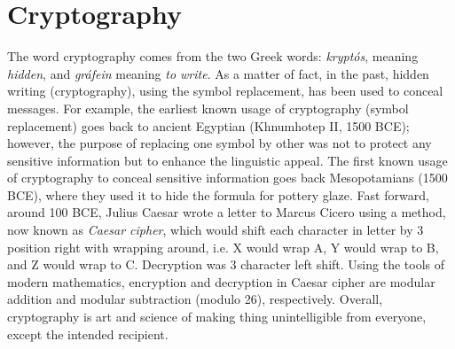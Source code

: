 \section{Cryptography}
\label{sec:cryptography}
    The word cryptography comes from the two Greek words: 
    \textit{krypt\'{o}s}, meaning \textit{hidden}, and \textit{gr\'{a}fein} meaning \textit{to write}. As a matter of 
    fact, in the past, hidden writing (cryptography), using the symbol replacement, has been used 
    to conceal messages. For example,
    the earliest known usage of cryptography (symbol replacement) goes back to  ancient 
    Egyptian (Khnumhotep {\rm II}, 1500 BCE); however, the purpose of replacing one symbol by other 
    was not to protect
    any sensitive information but to enhance the linguistic appeal. The first known usage of 
    cryptography to conceal sensitive information goes back Mesopotamians (1500 BCE), where 
    they used it to hide the formula for pottery glaze. Fast forward, around 100 BCE, 
    Julius Caesar wrote a letter to Marcus  Cicero using a method, now known 
    as \textit{Caesar cipher}, which would shift each character in letter by 3 position right with wrapping 
    around, i.e. X would wrap A, Y would wrap to B, and Z would wrap to C. Decryption was 
	3 character left shift.  Using the  tools of modern mathematics, encryption and decryption 
	in Caesar cipher are modular addition and modular subtraction (modulo 26), respectively.  
    Overall, cryptography is art and science of making thing  unintelligible from everyone, except the 
    intended recipient.  	
	    
